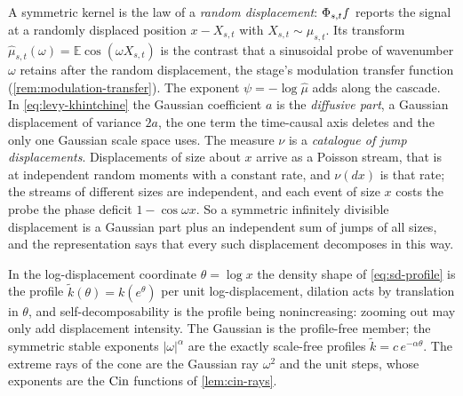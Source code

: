 \begin{remark}\label{rem:displacement-dictionary}
A symmetric kernel is the law of a \emph{random displacement}: $\Phi_{s,t}f$ reports the
signal at a randomly displaced position $x - X_{s,t}$ with $X_{s,t} \sim \mu_{s,t}$. Its
transform $\hat\mu_{s,t}(\omega) = \mathbb{E}\cos(\omega X_{s,t})$ is the contrast that a
sinusoidal probe of wavenumber $\omega$ retains after the random displacement, the stage's
modulation transfer function (\ref{rem:modulation-transfer}). The exponent
$\psi = -\log\hat\mu$ adds along the cascade. In \ref{eq:levy-khintchine} the Gaussian
coefficient $a$ is the \emph{diffusive part}, a Gaussian displacement of variance $2a$, the one
term the time-causal axis deletes and the only one Gaussian scale space uses. The measure $\nu$
is a \emph{catalogue of jump displacements}. Displacements of size about $x$ arrive as a
Poisson stream, that is at independent random moments with a constant rate, and $\nu(dx)$ is
that rate; the streams of different sizes are independent, and each event of size $x$ costs the
probe the phase deficit $1 - \cos\omega x$. So a symmetric infinitely divisible displacement is
a Gaussian part plus an independent sum of jumps of all sizes, and the representation says that
every such displacement decomposes in this way.
\end{remark}

\begin{remark}\label{rem:displacement-profile-log}
In the log-displacement coordinate $\theta = \log x$ the density shape of \ref{eq:sd-profile}
is the profile $\tilde k(\theta) = k(e^\theta)$ per unit log-displacement, dilation acts by
translation in $\theta$, and self-decomposability is the profile being nonincreasing: zooming
out may only add displacement intensity. The Gaussian is the profile-free member; the symmetric
stable exponents $|\omega|^\alpha$ are the exactly scale-free profiles
$\tilde k = c\,e^{-\alpha\theta}$. The extreme rays of the cone are the Gaussian ray $\omega^2$
and the unit steps, whose exponents are the $\operatorname{Cin}$ functions of \ref{lem:cin-rays}.
\end{remark}
